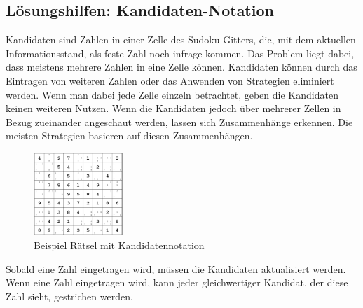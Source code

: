 \subsection{Lösungshilfen: Kandidaten-Notation}
Kandidaten sind Zahlen in einer Zelle des Sudoku Gitters, die, mit dem aktuellen Informationsstand, als feste Zahl noch infrage kommen. Das Problem liegt dabei, dass meistens mehrere Zahlen in eine Zelle können. Kandidaten können durch das Eintragen von weiteren Zahlen oder das Anwenden von Strategien eliminiert werden. Wenn man dabei jede Zelle einzeln betrachtet, geben die Kandidaten keinen weiteren Nutzen. Wenn die Kandidaten jedoch über mehrerer Zellen in Bezug zueinander angeschaut werden, lassen sich Zusammenhänge erkennen. Die meisten Strategien basieren auf diesen Zusammenhängen. 

\begin{figure}[H]
	\centering
	\includegraphics[width=0.3\textwidth]{images/BeispielKandidatennotation.png}
	\caption{Beispiel Rätsel mit Kandidatennotation}
	\label{fig:SudokugitterKandidaten}
\end{figure}

Sobald eine Zahl eingetragen wird, müssen die Kandidaten aktualisiert werden. Wenn eine Zahl eingetragen wird, kann jeder gleichwertiger Kandidat, der diese Zahl sieht, gestrichen werden. \cite[85\psq]{althofer2014spiele} \cite{martin} \cite[4]{zambon2015sudoku}

